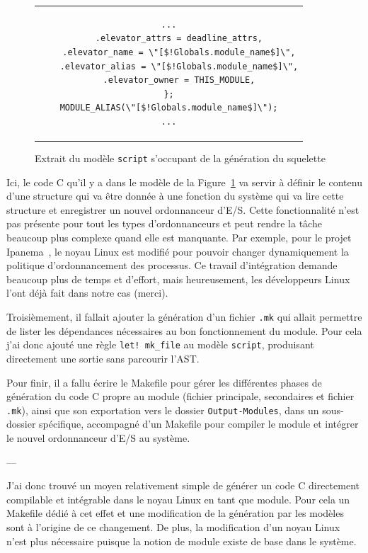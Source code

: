 \begin{figure}[h!t] \centering
    \begin{tabular}{c}
        \begin{lstlisting}[language=Phaistos-Template, linewidth=11.5cm]
    ...
    .elevator_attrs = deadline_attrs,
    .elevator_name = \"[$!Globals.module_name$]\",
    .elevator_alias = \"[$!Globals.module_name$]\",
    .elevator_owner = THIS_MODULE,
};
MODULE_ALIAS(\"[$!Globals.module_name$]\");
...
        \end{lstlisting}
    \end{tabular}
    \caption{Extrait du modèle \texttt{script} s'occupant de la génération du 
    squelette}
    \label{fig:module_name_c}
\end{figure}

Ici, le code C qu'il y a dans le modèle de la Figure~\ref{fig:module_name_c} va 
servir à définir le contenu d'une structure qui va être donnée à une fonction 
du système qui va lire cette structure et enregistrer un nouvel ordonnanceur 
d'E/S. Cette fonctionnalité n'est pas présente pour tout les types 
d'ordonnanceurs et peut rendre la tâche beaucoup plus complexe quand elle est 
manquante. Par exemple, pour le projet Ipanema~\cite{lepers2020provable}, le 
noyau Linux est modifié pour pouvoir changer dynamiquement la politique 
d'ordonnancement des processus. Ce travail d'intégration demande beaucoup plus 
de temps et d'effort, mais heureusement, les développeurs Linux l'ont déjà fait 
dans notre cas (merci).

Troisièmement, il fallait ajouter la génération d'un fichier \texttt{.mk} qui 
allait permettre de lister les dépendances nécessaires au bon fonctionnement du 
module. Pour cela j'ai donc ajouté une règle \texttt{let! mk\_file} au modèle 
\texttt{script}, produisant directement une sortie sans parcourir l'AST.

Pour finir, il a fallu écrire le Makefile pour gérer les différentes phases de 
génération du code C propre au module (fichier principale, secondaires et 
fichier \texttt{.mk}), ainsi que son exportation vers le dossier \texttt
{Output-Modules}, dans un sous-dossier spécifique, accompagné d'un Makefile 
pour compiler le module et intégrer le nouvel ordonnanceur d'E/S au système.

\begin{center}
---
\end{center}
    
J'ai donc trouvé un moyen relativement simple de générer un code C directement 
compilable et intégrable dans le noyau Linux en tant que module. Pour cela un 
Makefile dédié à cet effet et une modification de la génération par les modèles 
sont à l'origine de ce changement. De plus, la modification d'un noyau Linux 
n'est plus nécessaire puisque la notion de module existe de base dans le 
système.

